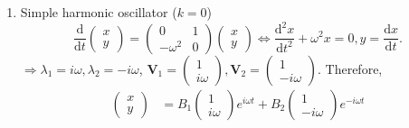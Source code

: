 \documentclass[12pt]{report}
\theoremstyle{definition}
\begin{document}
\begin{ex}
\begin{enumerate}[label = (\roman*)]
\begin{enumerate}[label = (\alph*)]
                    \item Simple harmonic oscillator ($k = 0$)\[
                        \frac{\mathrm{d}}{\mathrm{d}t} \begin{pmatrix}
                                x \\
                                y
                        \end{pmatrix} = \begin{pmatrix}
                        0 & 1 \\
                        -\omega^{2} & 0
                        \end{pmatrix} \begin{pmatrix}
                                x \\
                                y
                        \end{pmatrix} \iff \frac{\mathrm{d}^{2}x}{\mathrm{d}t^{2}} 
                        + \omega^{2}x = 0, y = \frac{\mathrm{d}x}{\mathrm{d}t}.
                    \]
                    $\Rightarrow{}\lambda_1 = i\omega, \lambda_2 = -i\omega$,
                    $\mathbf{V}_1 = \begin{pmatrix}
                            1 \\
                            i\omega
                        \end{pmatrix} , \mathbf{V}_2 = \begin{pmatrix}
                                1 \\
                                -i\omega
                        \end{pmatrix}$.
                        Therefore,\[
                            \begin{align*}
                            \begin{pmatrix}
                                    x \\
                                    y
                            \end{pmatrix} 
                            & = B_1\begin{pmatrix}
                                    1 \\
                                    i\omega
                            \end{pmatrix} e^{i\omega t} + B_{2} \begin{pmatrix}
                                    1 \\
                                    -i\omega
                            \end{pmatrix} e^{-i\omega t} \\

\end{align*}\]
\end{enumerate}
\end{enumerate}
\end{ex}
\end{document}
